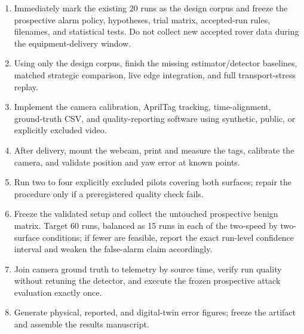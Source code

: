 \documentclass[11pt,a4paper]{article}
\begin{document}
\begin{enumerate}
    \item Immediately mark the existing 20 runs as the design corpus and freeze
    the prospective alarm policy, hypotheses, trial matrix, accepted-run rules,
    filenames, and statistical tests. Do not collect new accepted rover data
    during the equipment-delivery window.
    \item Using only the design corpus, finish the missing estimator/detector
    baselines, matched strategic comparison, live edge integration, and full
    transport-stress replay.
    \item Implement the camera calibration, AprilTag tracking, time-alignment,
    ground-truth CSV, and quality-reporting software using synthetic, public,
    or explicitly excluded video.
    \item After delivery, mount the webcam, print and measure the tags,
    calibrate the camera, and validate position and yaw error at known points.
    \item Run two to four explicitly excluded pilots covering both surfaces;
    repair the procedure only if a preregistered quality check fails.
    \item Freeze the validated setup and collect the untouched prospective
    benign matrix. Target 60 runs, balanced as 15 runs in each of the two-speed
    by two-surface conditions; if fewer are feasible, report the exact
    run-level confidence interval and weaken the false-alarm claim accordingly.
    \item Join camera ground truth to telemetry by source time, verify run
    quality without retuning the detector, and execute the frozen prospective
    attack evaluation exactly once.
    \item Generate physical, reported, and digital-twin error figures; freeze
    the artifact and assemble the results manuscript.
\end{enumerate}
\end{document}
